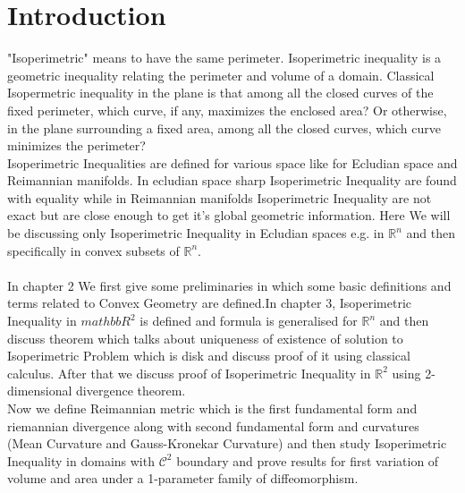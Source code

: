 \documentclass[oneside]{book}
\begin{document}
\chapter{Introduction}
\label{chap:c1}

 "Isoperimetric" means to have the same perimeter. Isoperimetric  inequality is a geometric inequality relating  the perimeter and volume of a domain. Classical Isopermetric inequality in the plane is that among all the closed curves of the fixed perimeter, which curve, if any, maximizes the enclosed area? Or otherwise, in the plane surrounding a fixed area, among all the closed curves, which curve minimizes the perimeter? \\
 
Isoperimetric Inequalities are defined for various space like for Ecludian space and Reimannian manifolds. In ecludian space sharp Isoperimetric Inequality are found with equality while in Reimannian manifolds Isoperimetric Inequality are not exact but are close enough to get it's global geometric information. Here We will be discussing only  Isoperimetric Inequality in Ecludian spaces e.g. in  $\mathbb{R}^{n}$ and then specifically in convex subsets of $\mathbb{R}^{n}$.
\\
\\
In chapter 2 We first give some preliminaries in which some basic definitions and terms related to Convex Geometry are defined.In chapter 3, Isoperimetric Inequality in $mathbb{R}^2$ is defined and formula is generalised for $\mathbb{R}^n$ and then discuss theorem which talks about uniqueness of existence of solution to Isoperimetric Problem which is disk and discuss proof of it using classical calculus. After that we discuss proof of Isoperimetric Inequality in $\mathbb{R}^2$  using 2-dimensional divergence theorem. \\
Now we define Reimannian metric which is the first fundamental form and  riemannian divergence  along with second fundamental form and curvatures (Mean Curvature and Gauss-Kronekar Curvature) and then study Isoperimetric Inequality in domains with $\mathcal{C}^2 $ boundary and prove  results for first variation  of volume and area under a 1-parameter family of diffeomorphism.
\end{document}
